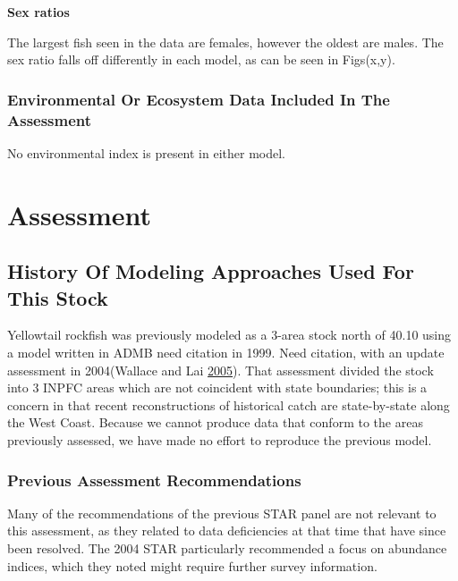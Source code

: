 \documentclass[12pt,]{article}
\begin{document}
\vspace{.5cm}

\textbf{Sex ratios}

The largest fish seen in the data are females, however the oldest are
males. The sex ratio falls off differently in each model, as can be seen
in Figs(x,y).

\subsubsection{Environmental Or Ecosystem Data Included In The
Assessment}\label{environmental-or-ecosystem-data-included-in-the-assessment}

No environmental index is present in either model.

\newpage

\section{Assessment}\label{assessment}

\subsection{History Of Modeling Approaches Used For This
Stock}\label{history-of-modeling-approaches-used-for-this-stock}

Yellowtail rockfish was previously modeled as a 3-area stock north of
40.10 using a model written in ADMB need citation in 1999. Need
citation, with an update assessment in 2004(Wallace and Lai
\protect\hyperlink{ref-Wallace2005}{2005}). That assessment divided the
stock into 3 INPFC areas which are not coincident with state boundaries;
this is a concern in that recent reconstructions of historical catch are
state-by-state along the West Coast. Because we cannot produce data that
conform to the areas previously assessed, we have made no effort to
reproduce the previous model.

\subsubsection{Previous Assessment
Recommendations}\label{previous-assessment-recommendations}

Many of the recommendations of the previous STAR panel are not relevant
to this assessment, as they related to data deficiencies at that time
that have since been resolved. The 2004 STAR particularly recommended a
focus on abundance indices, which they noted might require further
survey information.
\end{document}

